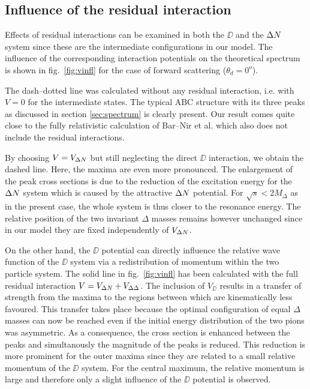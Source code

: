 \subsection{Influence of the residual interaction}
\label{sec:vinfl}

Effects of residual interactions can be examined in both the $\DD$ and the 
${\Delta N}$ system since these are the intermediate configurations in our model.
The influence of the corresponding interaction potentials on the theoretical
spectrum is shown in fig.\ \ref{fig:vinfl} for the case of forward scattering
($\theta_d = 0^o$).

The dash--dotted line was calculated without any residual interaction, 
i.e. with $V=0$ for the intermediate states. The typical ABC structure with 
its three peaks as discussed in section \ref{sec:spectrum} is clearly present.   
Our result comes quite close to the fully relativistic calculation of 
Bar--Nir et al. \cite{barnir75} which also does not include the residual
interactions.

By choosing $V=V_{{\Delta N}}$ but still neglecting the direct $\DD$ interaction,
we obtain the dashed line. Here, the maxima are even more pronounced.
The enlargement of the peak cross sections is due to the reduction of the
excitation energy for the ${\Delta N}$ system which is caused by the attractive
${\Delta N}$ potential. For $\sqrt{s} < 2 M_\Delta$ as in the present case,
the whole system is thus closer to the resonance energy. The relative 
position of the two invariant $\Delta$ masses remains however unchanged
since in our model they are fixed independently of $V_{{\Delta N}}$.

On the other hand, the $\DD$ potential can directly influence the relative 
wave function of the $\DD$ system via a redistribution of momentum
within the two particle system.
The solid line in fig.\ \ref{fig:vinfl} has been calculated with the full 
residual interaction $V = V_{\Delta N} + V_{\Delta \Delta}$. The inclusion of $V_\DD$ results in
a transfer of strength from the maxima to the regions between which are 
kinematically less favoured. This transfer takes place because the optimal configuration 
of equal $\Delta$ masses can now be reached even if the initial energy distribution
of the two pions was asymmetric. As a consequence, the cross section is enhanced 
between the peaks and simultanously the magnitude of the peaks is reduced. 
This reduction is more prominent for the outer maxima since they are related 
to a small relative momentum of the $\DD$ system. For the central maximum,
the relative momentum is large and therefore only a slight influence 
of the $\DD$ potential is observed.

